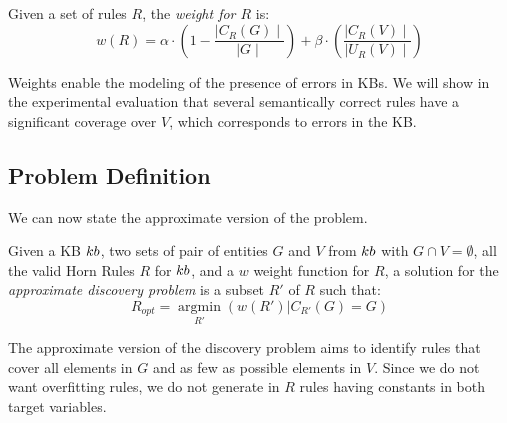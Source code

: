 \begin{definition}
	Given a set of rules $R$, the {\em weight for $R$} is:
	\begin{equation*}
		w(R) = \alpha \cdot (1-\frac{\mid C_{R}(G)\mid}{\mid G \mid}) +\beta \cdot (\frac{\mid C_{R}(V) \mid}{\mid U_{R}(V)\mid})
	\end{equation*}
\end{definition}

Weights enable the modeling of the presence of errors in KBs. We will show in the experimental evaluation that several semantically correct rules have a significant coverage over $V$, which corresponds to errors in the KB. 

\vspace{-1ex}	
\subsection{Problem Definition} \label{sec:krd_prob_def}
\vspace{-1ex}	
We can now state the approximate version of the problem.

\begin{definition}
	Given a KB ${\sc kb}$, two sets of pair of entities $G$ and $V$ from ${\sc kb}$ with $G \cap V = \emptyset$, all the valid Horn Rules $R$ for ${\sc kb}$, and a $w$ weight function for $R$, a solution for the \emph{approximate discovery problem} is a subset $R'$ of $R$  such that:
%
	$$R_{opt}=\underset{R'}{\operatorname{argmin}}(w(R') | C_{R'}(G) = G)$$
\end{definition}
\vspace{-1ex}	

The approximate version of the discovery problem aims to identify rules that cover all elements in $G$ and as few as possible elements in $V$. Since we do not want overfitting rules, we do not generate in $R$ rules having constants in both target variables.

